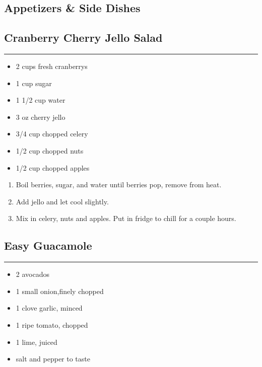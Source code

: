 \documentclass{article}
\begin{document}
\vspace*{\fill}
\begin{center}
    \section{Appetizers \& Side Dishes}
\end{center}
\vspace*{\fill}
\newpage

\subsection{Cranberry Cherry Jello Salad} 
\noindent\rule[0.5ex]{\linewidth}{1pt}

\begin{framed}
    \begin{itemize}
        \item 2 cups fresh cranberrys
        \item 1 cup sugar
        \item 1 1/2 cup water
        \item 3 oz cherry jello 
        \item 3/4 cup chopped celery 
        \item 1/2 cup chopped nuts 
        \item 1/2 cup chopped apples
    \end{itemize}
\end{framed}

\begin{enumerate}
    \item 
        Boil berries, sugar, and water until berries pop, remove from heat.
    \item 
        Add jello and let cool slightly.
    \item 
        Mix in celery, nuts and apples. Put in fridge to chill for a couple hours.
\end{enumerate}
\newpage

\subsection{Easy Guacamole} 
\noindent\rule[0.5ex]{\linewidth}{1pt}

\begin{framed}
\begin{itemize}
    \item 2 avocados
    \item 1 small onion,finely chopped
    \item 1 clove garlic, minced
    \item 1 ripe tomato, chopped
    \item 1 lime, juiced
    \item salt and pepper to taste
\end{itemize}
\end{framed}
\end{document}

